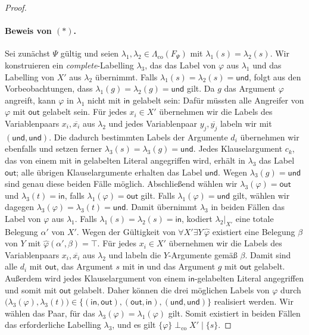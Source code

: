\begin{proof}
    \paragraph{Beweis von \((*)\).}
    Sei zunächst \(\Psi\) gültig und seien
    \(\lambda_1,\lambda_2\in\Lambda_{\mathrm{co}}(F_{\Psi})\) mit
    \(\lambda_1(s)=\lambda_2(s)\). Wir konstruieren ein
    \emph{complete}-Labelling \(\lambda_3\), das das Label von \(\varphi\) aus
    \(\lambda_1\) und das Labelling von \(X'\) aus \(\lambda_2\)
    übernimmt.
    Falls \(\lambda_1(s)=\lambda_2(s)=\mathsf{und}\), folgt aus den
    Vorbeobachtungen, dass \(\lambda_1(g)=\lambda_2(g)=\mathsf{und}\) gilt.
    Da \(g\) das Argument \(\varphi\) angreift, kann \(\varphi\) in
    \(\lambda_1\) nicht mit \(\mathsf{in}\) gelabelt sein: Dafür müssten alle
    Angreifer von \(\varphi\) mit \(\mathsf{out}\) gelabelt sein. Für jedes
    \(x_i\in X'\) übernehmen wir die Labels des Variablenpaars
    \(x_i,\overline{x_i}\) aus \(\lambda_2\) und jedes Variablenpaar
    \(y_j,\overline{y_j}\) labeln wir mit \((\mathsf{und},\mathsf{und})\). Die dadurch
    bestimmten Labels der Argumente \(d_i\) übernehmen wir ebenfalls und 
    setzen ferner \(\lambda_3(s)=\lambda_3(g)=\mathsf{und}\). Jedes
    Klauselargument \(c_k\), das von einem mit \(\mathsf{in}\) gelabelten
    Literal angegriffen wird, erhält in \(\lambda_3\) das Label \(\mathsf{out}\);
    alle übrigen Klauselargumente erhalten das Label \(\mathsf{und}\). Wegen
    \(\lambda_3(g)=\mathsf{und}\) sind genau diese beiden Fälle möglich.
    Abschließend wählen wir
    \(\lambda_3(\varphi)=\mathsf{out}\) und \(\lambda_3(t)=\mathsf{in}\), falls
    \(\lambda_1(\varphi)=\mathsf{out}\) gilt. Falls
    \(\lambda_1(\varphi)=\mathsf{und}\) gilt, wählen wir dagegen
    \(\lambda_3(\varphi)=\lambda_3(t)=\mathsf{und}\). Damit übernimmt
    \(\lambda_3\) in beiden Fällen das Label von \(\varphi\) aus
    \(\lambda_1\).
    Falls \(\lambda_1(s)=\lambda_2(s)=\mathsf{in}\), kodiert
    \(\lambda_2|_{X'}\) eine totale Belegung \(\alpha'\) von
    \(X'\). Wegen der Gültigkeit von
    \(\forall X'\exists Y\,\widehat{\varphi}\) existiert eine
    Belegung \(\beta\) von \(Y\) mit
    \(\widehat{\varphi}(\alpha',\beta)=\top\). Für jedes \(x_i\in X'\)
    übernehmen wir die Labels des Variablenpaars
    \(x_i,\overline{x_i}\) aus \(\lambda_2\) und labeln die
    \(Y\)-Argumente gemäß \(\beta\). Damit sind alle \(d_i\) mit
    \(\mathsf{out}\), das Argument \(s\) mit \(\mathsf{in}\) und das Argument \(g\) mit
    \(\mathsf{out}\) gelabelt. Außerdem wird jedes
    Klauselargument von einem \(\mathsf{in}\)-gelabelten Literal angegriffen
    und somit mit \(\mathsf{out}\) gelabelt. Daher können die drei möglichen
    Labels von \(\varphi\) durch
    \(
        \bigl(\lambda_3(\varphi),\lambda_3(t)\bigr)\in
        \{(\mathsf{in},\mathsf{out}),
          (\mathsf{out},\mathsf{in}),
          (\mathsf{und},\mathsf{und})\}
    \)
    realisiert werden. Wir wählen das Paar, für das
    \(\lambda_3(\varphi)=\lambda_1(\varphi)\) gilt. Somit existiert in
    beiden Fällen das
    erforderliche Labelling \(\lambda_3\), und es gilt
    \(\{\varphi\}\perp_{\mathrm{co}}X'\mid\{s\}\).


\end{proof}
